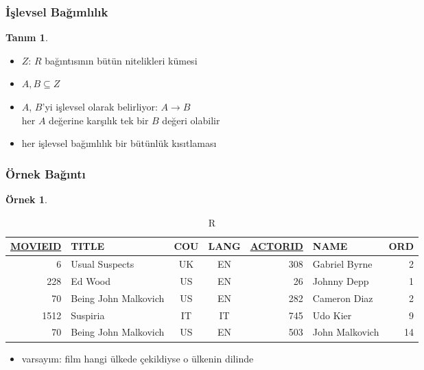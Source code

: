 \documentclass[dvipsnames]{beamer}
\theoremstyle{definition}
\newtheorem{tanim}[theorem]{Tanım}
\theoremstyle{example}
\newtheorem{ornek}[theorem]{Örnek}
\theoremstyle{plain}
\begin{document}
\begin{frame}
  \frametitle{İşlevsel Bağımlılık}

  \begin{tanim}
    \begin{itemize}
      \item $Z$: $R$ bağıntısının bütün nitelikleri kümesi
      \item $A,B \subseteq Z$

      \pause
      \item \alert{$A$, $B$'yi işlevsel olarak belirliyor}: $A \rightarrow B$\\
        her $A$ değerine karşılık tek bir $B$ değeri olabilir
    \end{itemize}
  \end{tanim}

  \pause
  \begin{itemize}
    \item her işlevsel bağımlılık bir bütünlük kısıtlaması
  \end{itemize}
\end{frame}

\begin{frame}
  \frametitle{Örnek Bağıntı}

  \begin{ornek}
    \begin{tiny}
    \begin{table}
      \caption{R}
      \begin{tabular}{|r|l|c|c|r|l|r|}\hline
\underline{MOVIEID} & TITLE    & COU & LANG & \underline{ACTORID} & NAME & ORD\\[2pt]\hline\hline
      6 & Usual Suspects       & UK  &  EN  &     308 & Gabriel Byrne    &   2\\\hline
    228 & Ed Wood              & US  &  EN  &      26 & Johnny Depp      &   1\\\hline
     70 & Being John Malkovich & US  &  EN  &     282 & Cameron Diaz     &   2\\\hline
   1512 & Suspiria             & IT  &  IT  &     745 & Udo Kier         &   9\\\hline
     70 & Being John Malkovich & US  &  EN  &     503 & John Malkovich   &  14\\\hline
      \end{tabular}
    \end{table}
    \end{tiny}

    \pause
    \begin{itemize}
      \item varsayım: film hangi ülkede çekildiyse o ülkenin dilinde
    \end{itemize}
  \end{ornek}
\end{frame}
\end{document}
